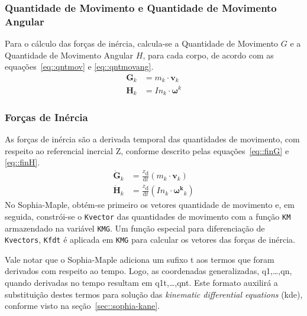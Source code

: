 \medskip {}

\subsubsection{Quantidade de Movimento e Quantidade de Movimento Angular}

Para o cálculo das forças de inércia, calcula-se a Quantidade de Movimento $G$ e
a Quantidade de Movimento Angular $H$, para cada corpo, de acordo com as
equações~\ref{eq::qntmov} e \ref{eq::qntmovang}.
%
\begin{align}
	\mathbf{G}_{k} &= m_{k} \cdot \mathbf{v}_{k} \label{eq::qntmov} \\
	\mathbf{H}_{k} &= In_{k} \cdot \boldsymbol\omega^{k} \label{eq::qntmovang}
\end{align}
%

\subsubsection{Forças de Inércia}

As forças de inércia são a derivada temporal das quantidades de movimento, com
respeito ao referencial inercial Z, conforme descrito pelas
equações~\ref{eq::finG} e \ref{eq::finH}.
%
\begin{align}
	\dot{\mathbf{G}}_{k} &= \frac{^{Z}\mathrm{d}}{\mathrm{d} t} (m_{k} \cdot
	\mathbf{v}_{k}) \label{eq::finG} \\
	\dot{\mathbf{H}}_{k} &= \frac{^{Z}\mathrm{d}}{\mathrm{d} t} (In_{k} \cdot
	\mathbf{\boldsymbol\omega^{k}}_{k}) \label{eq::finH}	
\end{align}
%
No Sophia-Maple, obtém-se primeiro os vetores quantidade de movimento e, em
seguida, constrói-se o \texttt{Kvector} das quantidades de movimento com a
função \texttt{KM} armazendado na variável \texttt{KMG}. Um função especial para
diferenciação de \texttt{Kvectors}, \texttt{Kfdt} é aplicada em \texttt{KMG} para
calcular os vetores das forças de inércia.

Vale notar que o Sophia-Maple adiciona um sufixo t aos termos que foram
derivados com respeito ao tempo.
Logo, as coordenadas generalizadas, q1,\ldots,qn, quando derivadas no tempo
resultam em q1t,\ldots,qnt. Este formato auxilirá a substituição destes termos
para solução das \textit{kinematic differential equations} (kde), conforme visto
na seção~\ref{sec::sophia-kane}.

